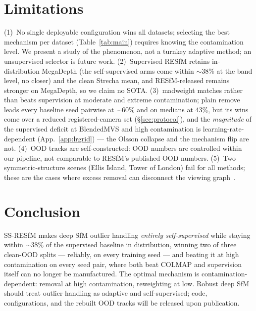 \documentclass{article}
\newcommand{\mad}{madweight}
\begin{document}
\section{Limitations}
(1)~No single deployable configuration wins all datasets; selecting the best mechanism per
dataset (Table~\ref{tab:main}) requires knowing the contamination level. We present a study
of the phenomenon, not a turnkey adaptive method; an unsupervised selector is future work.
(2)~Supervised RESfM retains in-distribution MegaDepth (the self-supervised arms come
within $\sim\!38\%$ at the band level, no closer) and the clean Strecha mean, and RESfM-released
remains stronger on MegaDepth, so we claim no SOTA. (3)~\mad{} matches rather than beats supervision at moderate and extreme contamination;
plain remove leads every baseline seed pairwise at $\sim\!60\%$ and on medians at
$43\%$, but its wins come over a reduced registered-camera set (\S\ref{sec:protocol}),
and the \emph{magnitude} of the supervised deficit at BlendedMVS and high contamination
is learning-rate-dependent (App.~\ref{app:lrgrid}) --- the Olsson collapse and the
mechanism flip are not.
(4)~OOD tracks are self-constructed: OOD numbers are controlled within our pipeline, not
comparable to RESfM's published OOD numbers. (5)~Two symmetric-structure scenes (Ellis
Island, Tower of London) fail for all methods; these are the cases where excess removal
can disconnect the viewing graph~\citep{resfm}.

\section{Conclusion}
SS-RESfM makes deep SfM outlier handling \emph{entirely self-supervised} while staying
within $\sim\!38\%$ of the supervised baseline in distribution, winning two of three
clean-OOD splits --- reliably, on every training seed --- and beating it at high
contamination on every seed pair, where both beat COLMAP and supervision itself can no
longer be manufactured. The optimal mechanism is contamination-dependent: removal at
high contamination, reweighting at low. Robust deep SfM should treat outlier handling as
adaptive and self-supervised; code, configurations, and the rebuilt OOD tracks will be
released upon publication.
\end{document}
